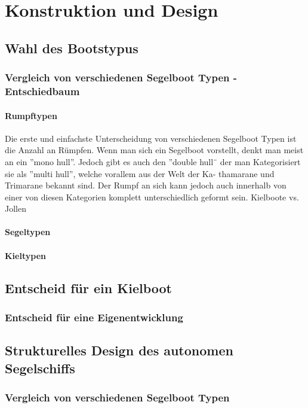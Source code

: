

\chapter{Konstruktion und Design}
\label{chap:konstruktion}
\section{Wahl des Bootstypus}
\subsection{Vergleich von verschiedenen Segelboot Typen - Entschiedbaum}
\subsubsection{Rumpftypen}
Die erste und einfachste Unterscheidung von verschiedenen Segelboot Typen ist die Anzahl an Rümpfen. Wenn man sich ein Segelboot vorstellt, denkt man meist an ein ”mono hull”. Jedoch gibt es auch den ”double hull¨ der man Kategorisiert sie als ”multi hull”, welche vorallem aus der Welt der Ka- thamarane und Trimarane bekannt sind.
Der Rumpf an sich kann jedoch auch innerhalb von einer von diesen Kategorien komplett unterschiedlich geformt sein.
Kielboote vs. Jollen

\subsubsection{Segeltypen}
\subsubsection{Kieltypen}
\section{Entscheid für ein Kielboot}
\subsection{Entscheid für eine Eigenentwicklung}

\section{Strukturelles Design des autonomen Segelschiffs}



\subsection{Vergleich von verschiedenen Segelboot Typen}

